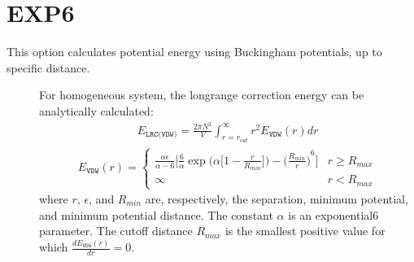\documentclass[letterpaper,10pt,english]{sphinxmanual}
\begin{document}
\section{EXP6}
\label{\detokenize{long_range_correction:exp6}}
This option calculates potential energy using Buckingham potentials, up to specific  distance.
\begin{description}
\item[{}] \leavevmode
For homogeneous system, the long\sphinxhyphen{}range correction energy can be analytically calculated:
\begin{equation*}
\begin{split}E_{\texttt{LRC(VDW)}} = \frac{2\pi N^2}{V} \int_{r=r_{cut}}^{\infty} r^2 E_{\texttt{VDW}}(r) dr\end{split}
\end{equation*}\begin{equation*}
\begin{split}E_{\texttt{VDW}}(r) =
\begin{cases}
  \frac{\alpha\epsilon}{\alpha-6} \bigg[\frac{6}{\alpha} \exp\bigg(\alpha \bigg[1-\frac{r}{R_{min}} \bigg]\bigg) - {\bigg(\frac{R_{min}}{r}\bigg)}^6 \bigg] &  r \geq R_{max} \\
  \infty & r < R_{max}
\end{cases}\end{split}
\end{equation*}
where \(r\), \(\epsilon\), and \(R_{min}\) are, respectively, the separation, minimum potential, and minimum potential distance.
The constant \(\alpha\) is an  exponential\sphinxhyphen{}6 parameter. The cutoff distance \(R_{max}\) is the smallest positive value for which \(\frac{dE_{\texttt{VDW}}(r)}{dr}=0\).


\end{description}
\end{document}
